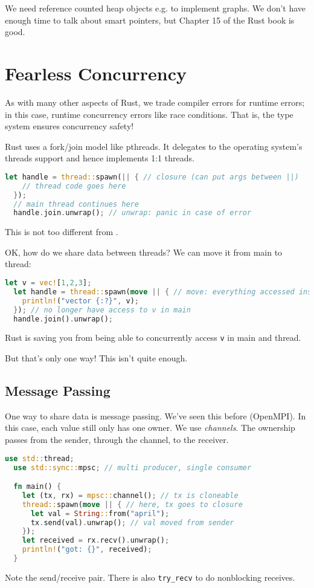 We need reference counted heap objects e.g. to implement graphs. We don't have
enough time to talk about smart pointers, but Chapter 15 of the Rust book is good.

\section*{Fearless Concurrency}
As with many other aspects of Rust, we trade compiler errors for runtime
errors; in this case, runtime concurrency errors like race conditions.
That is, the type system ensures concurrency safety!

Rust uses a fork/join model like pthreads. It delegates to the operating
system's threads support and hence implements 1:1 threads.
\begin{lstlisting}[language=Rust]
  let handle = thread::spawn(|| { // closure (can put args between ||)
    // thread code goes here
  });
  // main thread continues here
  handle.join.unwrap(); // unwrap: panic in case of error
\end{lstlisting}
This is not too different from \CPP.

OK, how do we share data between threads? We can move it from main to thread:
\begin{lstlisting}[language=Rust]
  let v = vec![1,2,3];
  let handle = thread::spawn(move || { // move: everything accessed inside closure is moved
    println!("vector {:?}", v);
  }); // no longer have access to v in main
  handle.join().unwrap();
\end{lstlisting}
Rust is saving you from being able to concurrently access {\tt v} in main and thread.

But that's only one way! This isn't quite enough.

\subsection*{Message Passing}
One way to share data is message passing. We've seen this before (OpenMPI).
In this case, each value still only has one owner. We use \emph{channels}. The ownership passes
from the sender, through the channel, to the receiver.
\begin{lstlisting}[language=Rust]
  use std::thread;
  use std::sync::mpsc; // multi producer, single consumer

  fn main() {
    let (tx, rx) = mpsc::channel(); // tx is cloneable
    thread::spawn(move || { // here, tx goes to closure
      let val = String::from("april");
      tx.send(val).unwrap(); // val moved from sender
    });
    let received = rx.recv().unwrap();
    println!("got: {}", received);
  }
\end{lstlisting}
Note the send/receive pair. There is also {\tt try\_recv} to do nonblocking receives.

